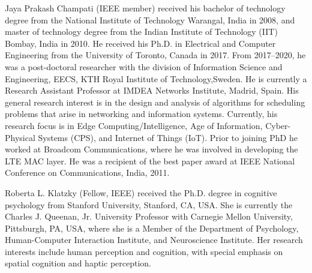 \begin{IEEEbiography}%
    Jaya Prakash Champati (IEEE member) received his bachelor of technology degree from the National Institute of Technology Warangal, India in 2008, and master of technology degree from the Indian Institute of Technology (IIT) Bombay, India in 2010.
    He received his Ph.D. in Electrical and Computer Engineering from the University of Toronto, Canada in 2017.
    From 2017--2020, he was a post-doctoral researcher with the division of Information Science and Engineering, EECS, KTH Royal Institute of Technology,Sweden.
    He is currently a Research Assistant Professor at IMDEA Networks Institute, Madrid, Spain.
    His general research interest is in the design and analysis of algorithms for scheduling problems that arise in networking and information systems.
    Currently, his research focus is in Edge Computing/Intelligence, Age of Information, Cyber-Physical Systems (CPS), and Internet of Things (IoT).
    Prior to joining PhD he worked at Broadcom Communications, where he was involved in developing the LTE MAC layer.
    He was a recipient of the best paper award at IEEE National Conference on Communications, India, 2011.
\end{IEEEbiography}
\begin{IEEEbiography}%
    Roberta L. Klatzky (Fellow, IEEE) received the Ph.D. degree in cognitive psychology from Stanford University, Stanford, CA, USA.
    She is currently the Charles J. Queenan, Jr. University Professor with Carnegie Mellon University, Pittsburgh, PA, USA, where she is a Member of the Department of Psychology, Human-Computer Interaction Institute, and Neuroscience Institute.
    Her research interests include human perception and cognition, with special emphasis on spatial cognition and haptic perception.
\end{IEEEbiography}
